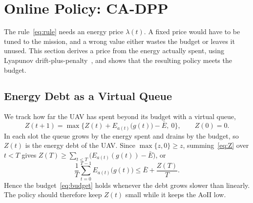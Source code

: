 \documentclass[5p,twocolumn]{elsarticle}
\theoremstyle{remark}
\begin{document}
\section{Online Policy: CA-DPP}\label{sec:lyap}
The rule~\eqref{eq:rule} needs an energy price $\lambda(t)$. A fixed price would have to be tuned to the mission, and a wrong value either wastes the budget or leaves it unused. This section derives a price from the energy actually spent, using Lyapunov drift-plus-penalty~\cite{neely2010book}, and shows that the resulting policy meets the budget.

\subsection{Energy Debt as a Virtual Queue}
We track how far the UAV has spent beyond its budget with a virtual queue,
\begin{equation}\label{eq:Z}
Z(t+1)=\max\Big\{Z(t)+E_{a(t)}\big(g(t)\big)-\bar E,\ 0\Big\},\qquad Z(0)=0.
\end{equation}
In each slot the queue grows by the energy spent and drains by the budget, so $Z(t)$ is the energy debt of the UAV. Since $\max\{z,0\}\ge z$, summing~\eqref{eq:Z} over $t<T$ gives $Z(T)\ge\sum_{t<T}\big(E_{a(t)}(g(t))-\bar E\big)$, or
\begin{equation}\label{eq:Zbound}
\frac1T\sum_{t=0}^{T-1}E_{a(t)}\big(g(t)\big)\le\bar E+\frac{Z(T)}{T}.
\end{equation}
Hence the budget~\eqref{eq:budget} holds whenever the debt grows slower than linearly. The policy should therefore keep $Z(t)$ small while it keeps the AoII low.
\end{document}
